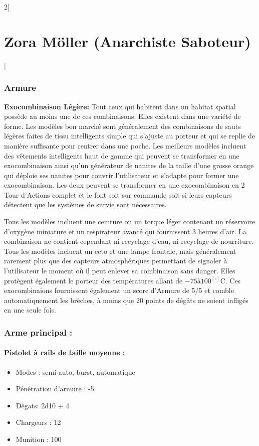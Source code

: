 \documentclass[a4paper,9pt]{article}
\begin{document}
\begin{multicols}{2}[\section*{Zora Möller (Anarchiste Saboteur)}]
   \subsubsection*{Armure}
\textbf{Exocombinaison Légère:} Tout ceux qui habitent dans un habitat
spatial possède au moins une de ces combinaisons. Elles existent dans une
variété de forme. Les modèles bon marché sont généralement des combinaisons de
sauts légères faites de tissu intelligents simple qui s'ajuste au porteur et qui
se replie de manière suffisante pour rentrer dans une poche. Les
meilleurs modèles incluent des vêtements intelligents haut de gamme qui peuvent
se transformer en une exocombinaison ainsi qu'un générateur de nanites de la
taille d'une grosse orange qui déploie ses nanites pour couvrir l'utilisateur
et s'adapte pour former une exocombinaison. Les deux peuvent se transformer en
une exocombinaison en 2 Tour d'Actions complet et le font soit sur commande soit
si leurs capteurs détectent que les systèmes de survie sont nécessaires. 

Tous les modèles incluent une ceinture ou un torque léger contenant un
réservoire d'oxygène miniature et un respirateur avancé qui fournissent 3
heures d'air. La combinaison ne contient cependant ni recyclage d'eau, ni
recyclage de nourriture. Tous les modèles incluent un ecto et une
lampe frontale, mais généralement rarement plus que des capteurs atmosphériques
permettant de signaler à l'utilisateur le moment où il peut enlever sa
combinaison sans danger. Elles protègent également le porteur des températures
allant de $-75 à 100^[\circ]$C. Ces exocombinaions fournissent également un
score d'Armure de 5/5 et comble automatiquement les brèches, à moins que 20
points de dégâts ne soient infligés en une seule fois.

\subsubsection*{Arme principal :}
\paragraph{Pistolet à rails de taille moyenne :}
\begin{itemize}
   \item Modes : semi-auto, burst, automatique
   \item Pénétration d'armure : -5
   \item Dêgats: 2d10 + 4
   \item Chargeurs : 12
   \item Munition : 100
\end{itemize}


\end{multicols}
\end{document}
